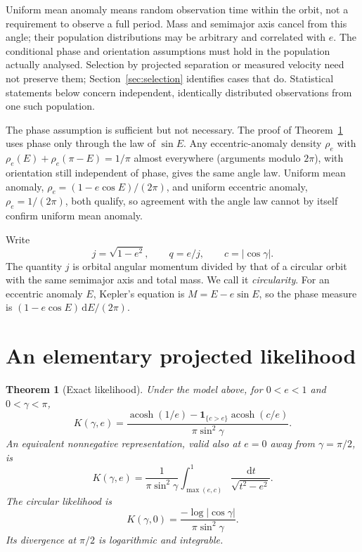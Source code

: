 \documentclass[11pt,a4paper]{article}
\newtheorem{theorem}{Theorem}[section]
\theoremstyle{remark}\newtheorem{remark}[theorem]{Remark}
\DeclareMathOperator{\acosh}{acosh}
\newcommand{\ind}{\mathbf 1}
\newcommand{\dd}{\,\mathrm d}
\begin{document}
Uniform mean anomaly means random observation time within the orbit, not a requirement to observe a full period. Mass and semimajor axis cancel from this angle; their population distributions may be arbitrary and correlated with $e$. The conditional phase and orientation assumptions must hold in the population actually analysed. Selection by projected separation or measured velocity need not preserve them; Section~\ref{sec:selection} identifies cases that do. Statistical statements below concern independent, identically distributed observations from one such population.

The phase assumption is sufficient but not necessary. The proof of Theorem~\ref{thm:kernel} uses phase only through the law of $\sin E$. Any eccentric-anomaly density $\rho_e$ with $\rho_e(E)+\rho_e(\pi-E)=1/\pi$ almost everywhere (arguments modulo $2\pi$), with orientation still independent of phase, gives the same angle law. Uniform mean anomaly, $\rho_e=(1-e\cos E)/(2\pi)$, and uniform eccentric anomaly, $\rho_e=1/(2\pi)$, both qualify, so agreement with the angle law cannot by itself confirm uniform mean anomaly.

Write
\begin{equation}
j=\sqrt{1-e^2},\qquad q=e/j,\qquad c=|\cos\gamma|.
\end{equation}
The quantity $j$ is orbital angular momentum divided by that of a circular orbit with the same semimajor axis and total mass. We call it \emph{circularity}. For an eccentric anomaly $E$, Kepler's equation is $M=E-e\sin E$, so the phase measure is $(1-e\cos E)\dd E/(2\pi)$.

\section{An elementary projected likelihood}\label{sec:kernel}

\begin{theorem}[Exact likelihood]\label{thm:kernel}
Under the model above, for $0<e<1$ and $0<\gamma<\pi$,
\begin{equation}\label{eq:kernel}
\boxed{\quad
K(\gamma,e)=
\frac{\acosh(1/e)-\ind_{\{c>e\}}\acosh(c/e)}{\pi\sin^2\gamma}.
\quad}
\end{equation}
An equivalent nonnegative representation, valid also at $e=0$ away from $\gamma=\pi/2$, is
\begin{equation}\label{eq:positive}
K(\gamma,e)=\frac{1}{\pi\sin^2\gamma}
\int_{\max(e,c)}^1\frac{\dd t}{\sqrt{t^2-e^2}}.
\end{equation}
The circular likelihood is
\begin{equation}\label{eq:circular}
K(\gamma,0)=\frac{-\log|\cos\gamma|}{\pi\sin^2\gamma}.
\end{equation}
Its divergence at $\pi/2$ is logarithmic and integrable.
\end{theorem}
\end{document}
